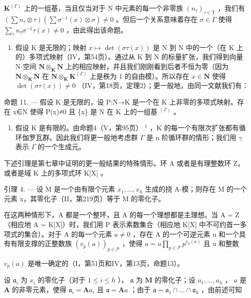 \(\mathbf{K}^{(\Gamma)}\) 上的一组基，当且仅当对于 N 中元素的每一个非零族 \((n_{\tau})_{\tau\in\mathrm{T}}\) ，我们有 \(\left(\sum n_{\tau}\otimes\tau\right)\left(\sum\sigma^{-1}(x)\otimes\sigma\right)\neq0\) 。但后一个关系意味着存在 \(\sigma\in\Gamma\) 使得 \(\sum_{\tau}n_{\tau}\sigma^{-1}\tau(x)\neq0\) ，由此得出该命题。

\begin{enumerate}
\def\labelenumi{\Alph{enumi})}
\tightlist
\item
  假设 K 是无限的；映射 \(x \mapsto \det(\sigma\tau(x))\) 是 N 到 N 中的一个（在 K 上的）多项式映射（IV，第54页）。通过从 K 到 N 的标量扩张，我们得到向量 N-空间 \(\mathbf{N} \otimes_{\mathbf{K}} \mathbf{N}\) 上的相应映射，并且我们刚刚看到后者不恒为零（因为 \(\mathbf{N} \otimes_{\mathbf{K}} \mathbf{N}\) 在 \(\mathbf{N} \otimes_{\mathbf{K}} \mathbf{K}^{(\Gamma)}\) 上是秩为 1 的自由模）。所以存在 \(x \in \mathbf{N}\) 使得 \(\det(\sigma\tau(x)) \neq 0\) （IV，第18页，定理2）；更一般地，由同一文献我们有：
\end{enumerate}

命题 11. --- 假设 K 是无限的，设 P:N→K 是一个在 K 上非零的多项式映射。存在 x∈N 使得 P(x)≠0 且 \{x\} 是 N 在 K 上的一组基 \(^{(\Gamma)}\) 。

\begin{enumerate}
\def\labelenumi{\Alph{enumi})}
\setcounter{enumi}{1}
\tightlist
\item
  假设 K 是有限的。由命题4（V，第95页） \(^{1}\) ，K 的每一个有限次扩张都有循环伽罗瓦群。因此我们将更一般地考虑群 \(\Gamma\) 是 n 阶循环群的情形；我们用 \(\gamma\) 表示 \(\Gamma\) 的一个生成元。
\end{enumerate}

下述引理是第七章中证明的更一般结果的特殊情形。环 A 或者是有理整数环 Z，或者是域 K 上的多项式环 K{[}X{]} 。

引理 4. --- 设 M 是一个由有限个元素 \(x_{1}, \ldots, x_{h}\) 生成的挠 A-模；则存在 M 的一个元素 x，其零化子（II，第219页）等于 M 的零化子。

在这两种情形下，A 都是一个整环，且 A 的每一个理想都是主理想。当 A = Z（相应地 A = K{[}X{]}）时，我们用 P 表示素数集合（相应地 K{[}X{]} 中不可约首一多项式的集合）。对于 A 的每一个元素 \(a \neq 0\) ，存在 A 的一个可逆元素 u 和一个具有有限支撑的正整数族 \((v_{p}(a))_{p \in \mathcal{P}}\) ，使得 \(a = u \prod_{p \in \mathcal{P}} p^{v_{p}(a)}\) 且 u 和整数

\(v_{p}(a)\) 是唯一确定的（I，第51页和IV，第13页，命题13）。

设 \(\mathfrak{a}_i\) 为 \(x_i\) 的零化子（对于 \(1 \leqslant i \leqslant h\) ）， \(\mathfrak{a}\) 为 \(\mathbf{M}\) 的零化子；设 \(a_1, \ldots, a_h\) ， \(a\) 是 \(\mathbf{A}\) 的非零元素，使得 \(\mathfrak{a}_i = \mathbf{A}a_i\) 且 \(\mathfrak{a} = \mathbf{A}a\) ；由于 \(\mathfrak{a} = \mathfrak{a}_1 \cap \ldots \cap \mathfrak{a}_h\) ，由前述可知

